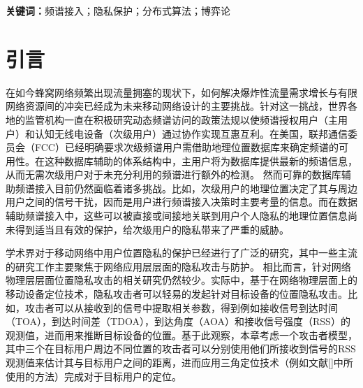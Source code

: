 \textbf{关键词：}频谱接入；隐私保护；分布式算法；博弈论

\section{引言}
在如今蜂窝网络频繁出现流量拥塞的现状下，如何解决爆炸性流量需求增长与有限网络资源间的冲突已经成为未来移动网络设计的主要挑战。针对这一挑战，世界各地的监管机构一直在积极研究动态频谱访问的政策法规以使频谱授权用户（主用户）和认知无线电设备（次级用户）通过协作实现互惠互利。在美国，联邦通信委员会（FCC）已经明确要求次级频谱用户需借助地理位置数据库来确定频谱的可用性\cite{FCCApril52012}。在这种数据库辅助的体系结构中，主用户将为数据库提供最新的频谱信息，从而无需次级用户对于未充分利用的频谱进行额外的检测\cite{db4}。
然而可靠的数据库辅助频谱接入目前仍然面临着诸多挑战。比如，次级用户的地理位置决定了其与周边用户之间的信号干扰，因而是用户进行频谱接入决策时主要考量的信息。而在数据辅助频谱接入中，这些可以被直接或间接地关联到用户个人隐私的地理位置信息尚未得到适当且有效的保护，给次级用户的隐私带来了严重的威胁。

学术界对于移动网络中用户位置隐私的保护已经进行了广泛的研究，其中一些主流的研究工作主要聚焦于网络应用层层面的隐私攻击与防护\cite{TII-crypo,TIE-DP}。
相比而言，针对网络物理层层面位置隐私攻击的相关研究仍然较少。实际中，基于在网络物理层面上的移动设备定位技术，隐私攻击者可以轻易的发起针对目标设备的位置隐私攻击。比如，攻击者可以从接收到的信号中提取相关参数，得到例如接收信号到达时间（TOA），到达时间差（TDOA），到达角度（AOA）和接收信号强度（RSS）\cite{TOARSS}的观测值，进而用来推断目标设备的位置。基于此观察，本章考虑一个攻击者模型，其中三个在目标用户周边不同位置的攻击者可以分别使用他们所接收到信号的RSS观测值来估计其与目标用户之间的距离，进而应用三角定位技术（例如文献[]中所使用的方法）完成对于目标用户的定位。

